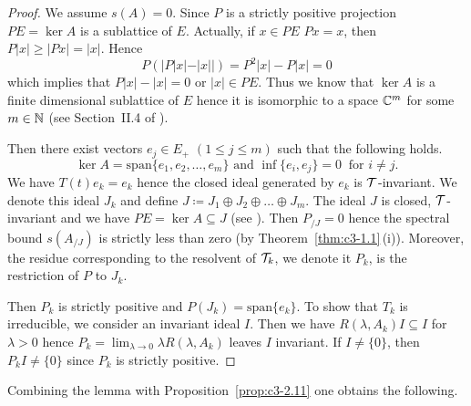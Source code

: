 \begin{proof}
We assume $s(A) = 0$. 
Since $P$ is a strictly positive projection $PE = \ker A$ is a sublattice of\/ $E$. 
Actually, if\/ $x \in PE$ \ie  $Px = x$, then $P|x| \geq |Px| = |x|$. 
Hence 
%
\[
	P(|P|x|-|x||) = P^{2}|x| - P|x| = 0
\]
%
which implies that $P|x| - |x| = 0$ or $|x| \in PE$.
Thus we know that $\ker A$ is a finite dimensional sublattice of\/ $E$ hence it is isomorphic to a space $\mathbb{C} ^{m}$ for some $m \in \mathbb{N}$ (see Section~II.4 of \textcite{schaefer:1974}). 
	
Then there exist vectors $e_{j} \in E_{+}$ $(1\leq j\leq m)$ such that the following holds.
\begin{equation}\label{eq:c3-3.18}
	\ker A = \mathrm{span} \{e_{1},e_{2}, \ldots ,e_{m}\} \text{ and } \inf\{e_{i},e_{j}\} = 0 \ \text{ for }  i \neq j .
\end{equation}
We have $T(t)e_{k} = e_{k}$ hence the closed ideal generated by $e_{k}$ is $\mathcal{T}$-invariant. 
We denote this ideal $J_{k}$ and define $J\coloneq  J_{1}\oplus J_{2}\oplus \ldots \oplus J_{m}$.
The ideal $J$ is closed, $\mathcal{T}$-invariant and we have $PE = \ker A \subseteq J$ (see \textcite[III Theorem~1.2]{schaefer:1974}). 
Then $P_{/J} = 0$ hence the spectral bound $s(A_{/J})$
	is strictly less than zero (by Theorem~\ref{thm:c3-1.1}\,(i)). 
	Moreover, the residue corresponding to the resolvent of\/ $\mathcal{T}_{k}$, we denote it $P_{k}$, is the restriction of\/ $P$ to $J_{k}$.
	
	Then $P_{k}$ is strictly positive and $P(J_{k}) = \mathrm{span}\{e_{k}\}$. 
	To show that $T_{k}$ is irreducible, we consider an invariant ideal $I$. 
	Then we have $R(\lambda,A_{k})I \subseteq I$ for $\lambda > 0$ hence $P_{k} = \lim_{\lambda \to 0}\lambda R(\lambda,A_{k})$ leaves $I$ invariant. 
	If\/ $I \neq \{0\}$, then $P_{k}I \neq \{0\}$ since $P_{k}$ is strictly positive. 
\end{proof}
Combining the lemma with Proposition~\ref{prop:c3-2.11} one obtains the following.

